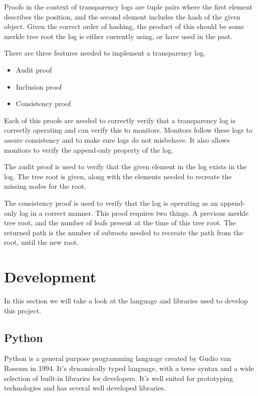 \documentclass[../Main/thesis.tex]{subfiles}
\begin{document}
    Proofs in the context of transparency logs are tuple pairs where the first
    element describes the position, and the second element includes the hash of
    the given object. Given the correct order of hashing, the product of this
    should be some merkle tree root the log is either currently using, or have
    used in the past.

    There are three features needed to implement a transparency log.

    \begin{itemize}
        \item Audit proof
        \item Inclusion proof
        \item Consistency proof
    \end{itemize}

    Each of this proofs are needed to correctly verify that a transparency log
    is correctly operating and can verify this to monitors.  Monitors follow
    these logs to assure consistency and to make sure logs do not misbehave. It
    also allows monitors to verify the append-only property of the log.

   The audit proof is used to  verify that the given element in the log exists
   in the log. The tree root is given, along with the elements needed to
   recreate the missing nodes for the root.

   The consistency proof is used to verify that the log is operating as an
   append-only log in a correct manner. This proof requires two things. A
   previous merkle tree root, and the number of leafs present at the time of
   this tree root. The returned path is the number of subroots needed to
   recreate the path from the root, until the new root.



\section{Development}\label{sec:development} 
In this section we will take a look at the language and libraries used to
develop this project.

    \subsection*{Python}
    Python is a general purpose programming language created by Gudio van Rossum
    in 1994. It's dynamically typed language, with a terse syntax and a wide
    selection of built-in libraries for developers. It's well suited for
    prototyping technologies and has several well developed libraries.
\end{document}
